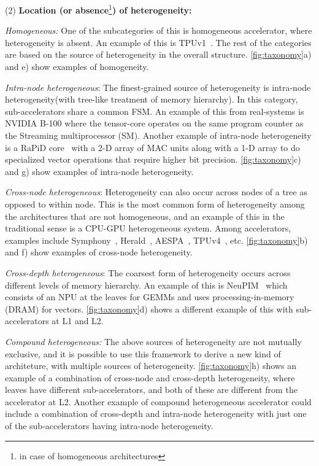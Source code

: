 (2) \textbf{Location (or absence}\footnote{in case of homogeneous architectures}\textbf{) of heterogeneity:} 

\textit{Homogeneous: }One of the subcategories of this is homogeneous accelerator, where heterogeneity is absent. An example of this is TPUv1~\cite{tpu-isca}. The rest of the categories are based on the source of heterogeneity in the overall structure. \autoref{fig:taxonomy}a) and e) show examples of homogeneity.

\textit{Intra-node heterogeneous}: The finest-grained source of heterogeneity is intra-node heterogeneity(with tree-like treatment of memory hierarchy). In this category, sub-accelerators share a common FSM. An example of this from real-systems is NVIDIA B-100 where the tensor-core operates on the same program counter as the Streaming multiprocessor (SM). Another example of intra-node heterogeneity is a RaPiD core~\cite{rapid} with a 2-D array of MAC units along with a 1-D array to do specialized vector operations that require higher bit precision. \autoref{fig:taxonomy}c) and g) show examples of intra-node heterogeneity.

\textit{Cross-node heterogeneous}: Heterogeneity can also occur across nodes of a tree as opposed to within node. This is the most common form of heterogeneity among the architectures that are not homogeneous, and an example of this in the traditional sense is a CPU-GPU heterogeneous system. Among accelerators, examples include Symphony~\cite{symphony}, Herald~\cite{kwon2021heterogeneous}, AESPA~\cite{qin2022enabling}, TPUv4~\cite{tpuv4}, etc. \autoref{fig:taxonomy}b) and f) show examples of cross-node heterogeneity.

\textit{Cross-depth heterogeneous}: The coarsest form of heterogeneity occurs across different levels of memory hierarchy. An example of this is NeuPIM~\cite{neupim} which consists of an NPU at the leaves for GEMMs and uses processing-in-memory (DRAM) for vectors. \autoref{fig:taxonomy}d) shows a different example of this with sub-accelerators at L1 and L2.

\textit{Compound heterogeneous:} The above sources of heterogeneity are not mutually exclusive, and it is possible to use this framework to derive a new kind of architeture, with multiple sources of heterogeneity. \autoref{fig:taxonomy}h) shows an example of a combination of cross-node and cross-depth heterogeneity, where leaves have different sub-accelerators, and both of these are different from the accelerator at L2. Another example of compound heterogeneous accelerator could include a combination of cross-depth and intra-node heterogeneity with just one of the sub-accelerators having intra-node heterogeneity.

